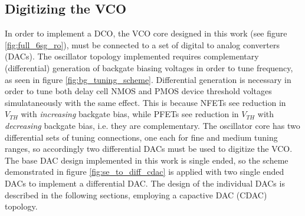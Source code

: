 	\subsection{Digitizing the VCO}
	In order to implement a DCO, the VCO core designed in this work (see figure \ref{fig:full_6sg_ro}), must be connected to a set of digital to analog converters (DACs). The oscillator topology implemented requires complementary (differential) generation of backgate biasing voltages in order to tune frequency, as seen in figure \ref{fig:bg_tuning_scheme}. Differential generation is necessary in order to tune both delay cell NMOS and PMOS device threshold voltages simulataneously with the same effect. This is because NFETs see reduction in $V_{TH}$ with \textit{increasing} backgate bias, while PFETs see reduction in $V_{TH}$ with \textit{decreasing} backgate bias, i.e. they are complementary. The oscillator core has two differential sets of tuning connections, one each for fine and medium tuning ranges, so accordingly two differential DACs must be used to digitize the VCO. The base DAC design implemented in this work is single ended, so the scheme demonstrated in figure \ref{fig:se_to_diff_cdac} is applied with two single ended DACs to implement a differential DAC. The design of the individual DACs is described in the following sections, employing a capactive DAC (CDAC) topology.

